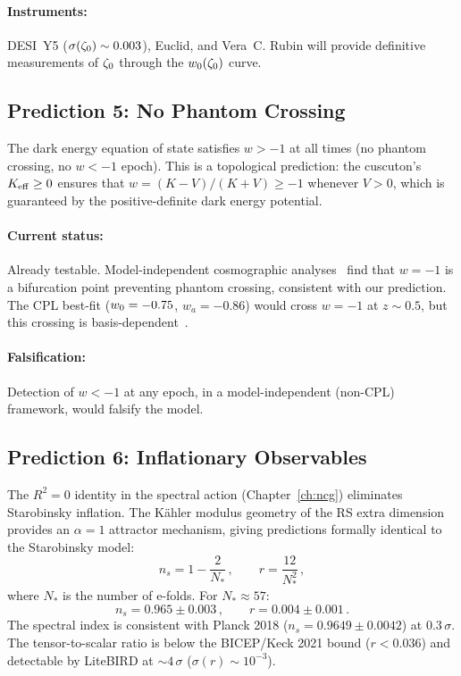 \paragraph{Instruments:} DESI~Y5 ($\sigma(\zeta_0) \sim 0.003$), Euclid, and Vera~C. Rubin will provide definitive measurements of $\zeta_0$ through the $w_0(\zeta_0)$ curve.

\subsection{Prediction 5: No Phantom Crossing}
\label{sec:1-pred5}

The dark energy equation of state satisfies $w > -1$ at all times (no phantom crossing, no $w < -1$ epoch). This is a topological prediction: the cuscuton's $K_{\mathrm{eff}} \geq 0$ ensures that $w = (K - V)/(K + V) \geq -1$ whenever $V > 0$, which is guaranteed by the positive-definite dark energy potential.

\paragraph{Current status:} Already testable. Model-independent cosmographic analyses~\cite{ch1:mandal25} find that $w = -1$ is a bifurcation point preventing phantom crossing, consistent with our prediction. The CPL best-fit ($w_0 = -0.75$, $w_a = -0.86$) would cross $w = -1$ at $z \sim 0.5$, but this crossing is basis-dependent~\cite{ch1:gomez25,ch1:lodha24,ch1:hasan25,ch1:mandal25,ch1:andrianomena25,ch1:marques25}.

\paragraph{Falsification:} Detection of $w < -1$ at any epoch, in a model-independent (non-CPL) framework, would falsify the model.

\subsection{Prediction 6: Inflationary Observables}
\label{sec:1-pred6}

The $R^2 = 0$ identity in the spectral action (Chapter~\ref{ch:ncg}) eliminates Starobinsky inflation. The K\"ahler modulus geometry of the RS extra dimension provides an $\alpha = 1$ attractor mechanism, giving predictions formally identical to the Starobinsky model:
\begin{equation}
\label{eq:1-inflation-pred}
n_s = 1 - \frac{2}{N_*}\,,\qquad r = \frac{12}{N_*^2}\,,
\end{equation}
where $N_*$ is the number of e-folds. For $N_* \approx 57$:
\begin{equation}
\label{eq:1-inflation-values}
n_s = 0.965 \pm 0.003\,,\qquad r = 0.004 \pm 0.001\,.
\end{equation}
The spectral index is consistent with Planck 2018 ($n_s = 0.9649 \pm 0.0042$) at $0.3\,\sigma$. The tensor-to-scalar ratio is below the BICEP/Keck 2021 bound ($r < 0.036$) and detectable by LiteBIRD at $\sim\!4\,\sigma$ ($\sigma(r) \sim 10^{-3}$).


